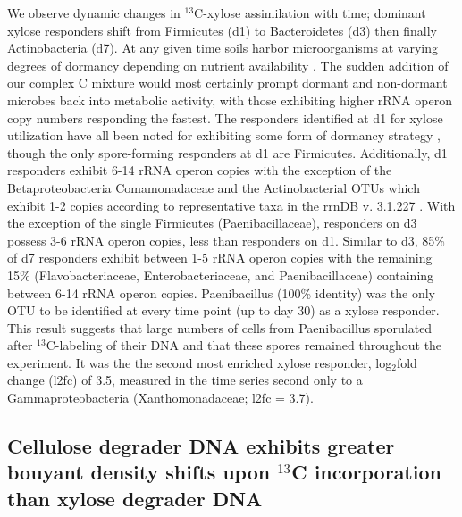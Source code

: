 We observe dynamic changes in $^{13}$C-xylose assimilation with
time; dominant xylose responders shift from Firmicutes (d1) to Bacteroidetes
(d3) then finally Actinobacteria (d7). At any given time soils harbor
microorganisms at varying degrees of dormancy depending on nutrient
availability \citep{Jones_2010}. The sudden addition of our complex C mixture
would most certainly prompt dormant and non-dormant microbes back into
metabolic activity, with those exhibiting higher rRNA operon copy numbers
responding the fastest. The responders identified at d1 for xylose utilization
have all been noted for exhibiting some form of dormancy strategy
\citep{Jones_2010, Mulyukin_2009, Darcy_2011, Sachidanandham_2008, Finkel_2006,
Rittershaus_2013, Tada_2013, Lay_2013}, though the only spore-forming
responders at d1 are Firmicutes. Additionally, d1 responders exhibit 6-14 rRNA
operon copies with the exception of the Betaproteobacteria Comamonadaceae and
the Actinobacterial OTUs which exhibit 1-2 copies according to representative
taxa in the rrnDB v. 3.1.227 \citep{18948294,11125085}. With the exception of
the single Firmicutes (Paenibacillaceae), responders on d3 possess 3-6 rRNA
operon copies, less than responders on d1. Similar to d3, 85\% of d7 responders
exhibit between 1-5 rRNA operon copies with the remaining 15\%
(Flavobacteriaceae, Enterobacteriaceae, and Paenibacillaceae) containing
between 6-14 rRNA operon copies. Paenibacillus (100\% identity) was the only
OTU to be identified at every time point (up to day 30) as a xylose responder.
This result suggests that large numbers of cells from Paenibacillus sporulated
after $^{13}$C-labeling of their DNA and that these spores
remained throughout the experiment. It was the the second most enriched xylose
responder, log$_{2}$fold change (l2fc) of 3.5, measured in the time series
second only to a Gammaproteobacteria (Xanthomonadaceae; l2fc = 3.7).

\subsection{Cellulose degrader DNA exhibits greater bouyant density shifts upon $^{13}$C incorporation than xylose degrader DNA}
